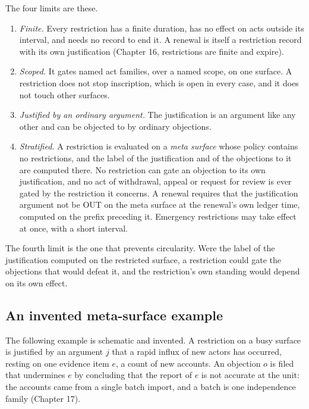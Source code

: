 \documentclass[11pt]{article}
\newcommand{\OUT}{\textsf{OUT}}
\begin{document}
The four limits are these.
\begin{enumerate}[nosep]
\item \emph{Finite.} Every restriction has a finite duration, has no effect on acts outside its interval, and needs no record to end it. A renewal is itself a restriction record with its own justification (Chapter 16, restrictions are finite and expire).
\item \emph{Scoped.} It gates named act families, over a named scope, on one surface. A restriction does not stop inscription, which is open in every case, and it does not touch other surfaces.
\item \emph{Justified by an ordinary argument.} The justification is an argument like any other and can be objected to by ordinary objections.
\item \emph{Stratified.} A restriction is evaluated on a \emph{meta surface} whose policy contains no restrictions, and the label of the justification and of the objections to it are computed there. No restriction can gate an objection to its own justification, and no act of withdrawal, appeal or request for review is ever gated by the restriction it concerns. A renewal requires that the justification argument not be \OUT{} on the meta surface at the renewal's own ledger time, computed on the prefix preceding it. Emergency restrictions may take effect at once, with a short interval.
\end{enumerate}

The fourth limit is the one that prevents circularity. Were the label of the justification computed on the restricted surface, a restriction could gate the objections that would defeat it, and the restriction's own standing would depend on its own effect.

\subsection{An invented meta-surface example}

The following example is schematic and invented. A restriction on a busy surface is justified by an argument $j$ that a rapid influx of new actors has occurred, resting on one evidence item $e$, a count of new accounts. An objection $o$ is filed that undermines $e$ by concluding that the report of $e$ is not accurate at the unit: the accounts came from a single batch import, and a batch is one independence family (Chapter 17).
\end{document}
